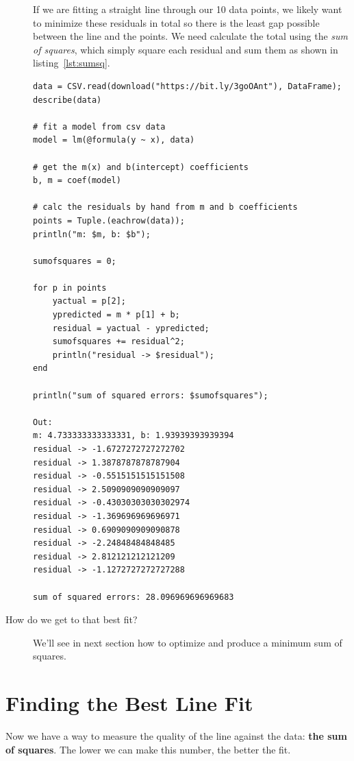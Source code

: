 \documentclass[a4paper, 11pt]{article}
\begin{document}
\begin{description}
	If we are fitting a straight line through our 10 data points, we likely want to minimize these residuals in total so there is the least gap possible between the line and the points. We need calculate the total using the \textit{sum of squares}, which simply square each residual and sum them as shown in listing~\ref{lst:sumsq}.
	
\begin{lstlisting}[caption={Calculating the sum of squares for a given line and data},label={lst:sumsq}]
data = CSV.read(download("https://bit.ly/3goOAnt"), DataFrame);
describe(data)

# fit a model from csv data
model = lm(@formula(y ~ x), data)

# get the m(x) and b(intercept) coefficients
b, m = coef(model)

# calc the residuals by hand from m and b coefficients
points = Tuple.(eachrow(data));
println("m: $m, b: $b");

sumofsquares = 0;

for p in points
    yactual = p[2];
    ypredicted = m * p[1] + b;
    residual = yactual - ypredicted;
    sumofsquares += residual^2;
    println("residual -> $residual");
end

println("sum of squared errors: $sumofsquares");

Out:
m: 4.733333333333331, b: 1.93939393939394
residual -> -1.6727272727272702
residual -> 1.3878787878787904  
residual -> -0.5515151515151508 
residual -> 2.5090909090909097  
residual -> -0.43030303030302974
residual -> -1.369696969696971  
residual -> 0.6909090909090878  
residual -> -2.24848484848485   
residual -> 2.812121212121209   
residual -> -1.1272727272727288 

sum of squared errors: 28.096969696969683
\end{lstlisting}	
	 
	\item[How do we get to that best fit?] We'll see in next section how to optimize and produce a minimum sum of squares.
	
\end{description}

\section{Finding the Best Line Fit}

Now we have a way to measure the quality of the line against the data: \textbf{the sum of squares}. The lower we can make this number, the better the fit.
\end{document}
